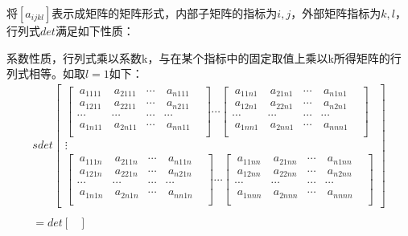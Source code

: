 \documentclass[twoside,a4paper,CCT]{cctart}   %
\begin{document}
将$[a_{ijkl}]$表示成矩阵的矩阵形式，内部子矩阵的指标为$i,j$，外部矩阵指标为$k,l$，行列式$det$满足如下性质：
\begin{list}{}
{
\setlength{\rightmargin}{\leftmargin}}
\item
系数性质，行列式乘以系数k，与在某个指标中的固定取值上乘以k所得矩阵的行列式相等。如取$l=1$如下：
\begin{align*}
s det
  \begin{bmatrix}
  \begin{bmatrix}
  \  a_{1111}&\  a_{2111}&\cdots&\  a_{n111}\\
 \  a_{1211}&\  a_{2211}&\cdots&\  a_{n211}\\
  \cdots&\cdots&\cdots &\cdots& \\
\  a_{1n11}&\  a_{2n11}&\cdots&\  a_{nn11}\\
 \end{bmatrix}
\cdots
\begin{bmatrix}
\  a_{11n1}&\  a_{21n1}&\cdots&\  a_{n1n1}\\
\  a_{12n1}&\  a_{22n1}&\cdots&\  a_{n2n1}\\
  \cdots&\cdots&\cdots &\cdots& \\
\  a_{1nn1}&\  a_{2nn1}&\cdots&\  a_{nnn1}\\
\end{bmatrix}\\
\vdots\\
\begin{bmatrix}
\  a_{111n}& \  a_{211n}&\cdots&\  a_{n11n}\\
\  a_{121n}& \  a_{221n}&\cdots&\  a_{n21n}\\
  \cdots&\cdots&\cdots &\cdots& \\
\  a_{1n1n}& \  a_{2n1n}&\cdots& \  a_{nn1n}\\
\end{bmatrix}
\cdots
\begin{bmatrix}
\  a_{11nn}& \  a_{21nn}&\cdots&\  a_{n1nn}\\
\  a_{12nn}& \  a_{22nn}&\cdots&\  a_{n2nn}\\
  \cdots&\cdots&\cdots &\cdots& \\
\  a_{1nnn}& \  a_{2nnn}&\cdots&\  a_{nnnn}\\
\end{bmatrix}
\end{bmatrix}\\
\\
=det
  \begin{bmatrix}

\end{bmatrix}
\end{align*}
\end{list}
\end{document}
